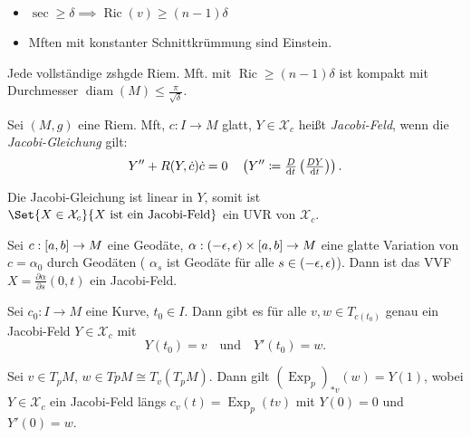 \documentclass{cheat-sheet}
\DeclareMathOperator{\Exp}{Exp} %
\newcommand{\vinterval}{\ointerval{-\epsilon}{\epsilon}} %
\DeclareMathOperator{\diam}{diam} %
\DeclareMathOperator{\Ric}{Ric} %
\newcommand{\abinterval}{\cinterval{a}{b}} %
\newcommand{\VF}{\mathcal{X}} %
\begin{document}
\begin{beob}
  \begin{itemize}
    \item $\sec \geq \delta \implies \Ric(v) \geq (n{-}1) \delta$
    \item Mften mit konstanter Schnittkrümmung sind Einstein.
  \end{itemize}
\end{beob}

\begin{satz}
  Jede vollständige zshgde Riem. Mft. mit $\Ric \geq (n{-}1)\delta$ ist kompakt mit Durchmesser $\diam(M) \leq \tfrac{\pi}{\sqrt{\delta}}$.
\end{satz}


\begin{defn}
  Sei $(M, g)$ eine Riem. Mft, $c : I \to M$ glatt, $Y \in \VF_c$ heißt \emph{Jacobi-Feld}, wenn die \emph{Jacobi-Gleichung} gilt:
  \[
    Y'' + R(Y, \dot{c}) \dot{c} = 0 \quad
    \left( Y'' \coloneqq \tfrac{D}{\mathrm{d} t} \left( \tfrac{D Y}{\mathrm{d} t} \right) \right).
  \]
\end{defn}

\begin{bem}
  Die Jacobi-Gleichung ist linear in $Y$, somit ist $\Set{ X \in \VF_c }{ X \text{ ist ein Jacobi-Feld} }$ ein UVR von $\VF_c$.
\end{bem}

\begin{satz}
  Sei $c : \abinterval \to M$ eine Geodäte, $\alpha : \vinterval \times \abinterval \to M$ eine glatte Variation von $c = \alpha_0$ durch Geodäten (\dh{} $\alpha_s$ ist Geodäte für alle $s \in \vinterval$). Dann ist das VVF $X = \tfrac{\partial \alpha}{\partial s}(0,t)$ ein Jacobi-Feld.
\end{satz}

\begin{satz}
  Sei $c_0 : I \to M$ eine Kurve, $t_0 \in I$. Dann gibt es für alle $v, w \in T_{c(t_0)}$ genau ein Jacobi-Feld $Y \in \VF_c$ mit
  \[
    Y(t_0) = v
    \quad \text{und} \quad
    Y'(t_0) = w.
  \]
\end{satz}

\begin{satz}
  Sei $v \in T_p M$, $w \in Tp M \cong T_v \left( T_p M \right)$. Dann gilt $(\Exp_p)_{*v}(w) = Y(1)$, wobei $Y \in \VF_c$ ein Jacobi-Feld längs $c_v(t) = \Exp_p(tv)$ mit $Y(0) = 0$ und $Y'(0) = w$.
\end{satz}
\end{document}
